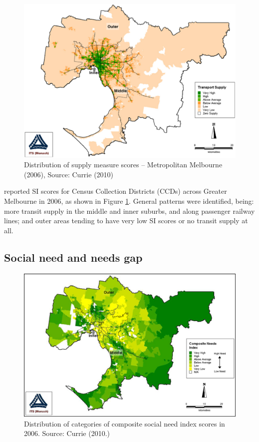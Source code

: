 \documentclass[preprint, 3p,
authoryear]{elsarticle} %
\begin{document}
\begin{figure}
\includegraphics[width=1\linewidth]{graphics/Currie2010SI} \caption{Distribution of supply measure scores – Metropolitan Melbourne (2006), Source: Currie (2010)}\label{fig:Currie_map_SI}
\end{figure}

\citet{currie2010identifying} reported SI scores for Census Collection
Districts (CCDs) across Greater Melbourne in 2006, as shown in Figure
\ref{fig:Currie_map_SI}. General patterns were identified, being: more
transit supply in the middle and inner suburbs, and along passenger
railway lines; and outer areas tending to have very low SI scores or no
transit supply at all.

\hypertarget{social-need-and-needs-gap}{%
\subsection{Social need and needs gap}\label{social-need-and-needs-gap}}

\begin{figure}
\includegraphics[width=1\linewidth]{graphics/Currie2010Needs} \caption{Distribution of categories of composite social need index scores in 2006. Source: Currie (2010.)}\label{fig:Currie_map_needs}
\end{figure}
\end{document}
